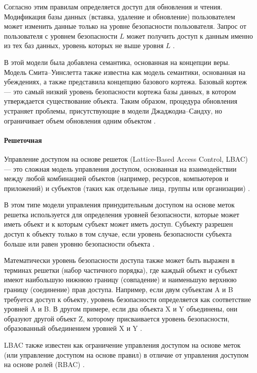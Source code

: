 Согласно этим правилам определяется доступ для обновления и чтения. Модификация базы данных (вставка, удаление
и обновление) пользователем может изменить данные только на уровне безопасности пользователя. Запрос от пользователя
с уровнем безопасности $L$ может получить доступ к данным именно из тех баз данных, уровень которых не выше уровня $L$
\autocite{Osama}.

В этой модели была добавлена семантика, основанная на концепции веры. Модель Смита–Уинслетта также известна как
модель семантики, основанная на убеждениях, а также представила концепцию базового кортежа. Базовый кортеж ---
это самый низкий уровень безопасности кортежа базы данных, в котором утверждается существование объекта.
Таким образом, процедура обновления устраняет проблемы, присутствующие в модели Джаджодиа–Сандху, но ограничивает
объем обновления одним объектом \autocite{Osama}.

\paragraph{Решеточная}

Управление доступом на основе решеток (Lattice-Based Access Control, LBAC) --- это сложная модель управления доступом,
основанная на взаимодействии между любой комбинацией объектов (например, ресурсов, компьютеров и приложений) и
субъектов (таких как отдельные лица, группы или организации) \autocite{LBAC}.

В этом типе модели управления принудительным доступом на основе меток решетка используется для определения уровней
безопасности, которые может иметь объект и к которым субъект может иметь доступ. Субъекту разрешен доступ к объекту
только в том случае, если уровень безопасности субъекта больше или равен уровню безопасности объекта \autocite{LBAC}.

Математически уровень безопасности доступа также может быть выражен в терминах решетки (набор частичного порядка),
где каждый объект и субъект имеют наибольшую нижнюю границу (совпадение) и наименьшую верхнюю границу (соединение)
прав доступа. Например, если двум субъектам A и B требуется доступ к объекту, уровень безопасности определяется как
соответствие уровней A и B. В другом примере, если два объекта X и Y объединены, они образуют другой объект Z,
которому присваивается уровень безопасности, образованный объединением уровней X и Y \autocite{LBAC}.

LBAC также известен как ограничение управления доступом на основе меток (или управление доступом на основе правил)
в отличие от управления доступом на основе ролей (RBAC) \autocite{LBAC}.

